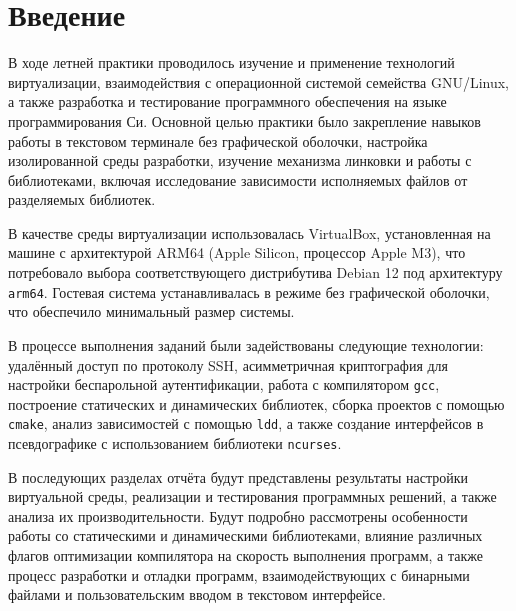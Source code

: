 \section*{Введение}

В ходе летней практики проводилось изучение и применение технологий виртуализации, взаимодействия с операционной системой семейства GNU/Linux, а также разработка и тестирование программного обеспечения на языке программирования Си. Основной целью практики было закрепление навыков работы в текстовом терминале без графической оболочки, настройка изолированной среды разработки, изучение механизма линковки и работы с библиотеками, включая исследование зависимости исполняемых файлов от разделяемых библиотек.

В качестве среды виртуализации использовалась VirtualBox, установленная на машине с архитектурой ARM64 (Apple Silicon, процессор Apple M3), что потребовало выбора соответствующего дистрибутива Debian 12 под архитектуру \texttt{arm64}. Гостевая система устанавливалась в режиме без графической оболочки, что обеспечило минимальный размер системы.

В процессе выполнения заданий были задействованы следующие технологии: удалённый доступ по протоколу SSH, асимметричная криптография для настройки беспарольной аутентификации, работа с компилятором \texttt{gcc}, построение статических и динамических библиотек, сборка проектов с помощью \texttt{cmake}, анализ зависимостей с помощью \texttt{ldd}, а также создание интерфейсов в псевдографике с использованием библиотеки \texttt{ncurses}.

В последующих разделах отчёта будут представлены результаты настройки виртуальной среды, реализации и тестирования программных решений, а также анализа их производительности. Будут подробно рассмотрены особенности работы со статическими и динамическими библиотеками, влияние различных флагов оптимизации компилятора на скорость выполнения программ, а также процесс разработки и отладки программ, взаимодействующих с бинарными файлами и пользовательским вводом в текстовом интерфейсе.
